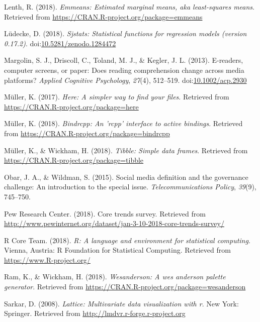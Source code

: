 \documentclass[man, fleqn, noextraspace]{apa6}
\theoremstyle{definition}
\theoremstyle{definition}
\theoremstyle{definition}
\theoremstyle{remark}
\begin{document}
\hypertarget{ref-R-emmeans}{}
Lenth, R. (2018). \emph{Emmeans: Estimated marginal means, aka
least-squares means}. Retrieved from
\url{https://CRAN.R-project.org/package=emmeans}

\hypertarget{ref-R-sjstats}{}
Lüdecke, D. (2018). \emph{Sjstats: Statistical functions for regression
models (version 0.17.2)}.
doi:\href{https://doi.org/10.5281/zenodo.1284472}{10.5281/zenodo.1284472}

\hypertarget{ref-Margolin2013}{}
Margolin, S. J., Driscoll, C., Toland, M. J., \& Kegler, J. L. (2013).
E-readers, computer screens, or paper: Does reading comprehension change
across media platforms? \emph{Applied Cognitive Psychology},
\emph{27}(4), 512--519.
doi:\href{https://doi.org/10.1002/acp.2930}{10.1002/acp.2930}

\hypertarget{ref-R-here}{}
Müller, K. (2017). \emph{Here: A simpler way to find your files}.
Retrieved from \url{https://CRAN.R-project.org/package=here}

\hypertarget{ref-R-bindrcpp}{}
Müller, K. (2018). \emph{Bindrcpp: An 'rcpp' interface to active
bindings}. Retrieved from
\url{https://CRAN.R-project.org/package=bindrcpp}

\hypertarget{ref-R-tibble}{}
Müller, K., \& Wickham, H. (2018). \emph{Tibble: Simple data frames}.
Retrieved from \url{https://CRAN.R-project.org/package=tibble}

\hypertarget{ref-Obar2015}{}
Obar, J. A., \& Wildman, S. (2015). Social media definition and the
governance challenge: An introduction to the special issue.
\emph{Telecommunications Policy}, \emph{39}(9), 745--750.

\hypertarget{ref-Pew}{}
Pew Research Center. (2018). Core trends survey. Retrieved from
\url{http://www.pewinternet.org/dataset/jan-3-10-2018-core-trends-survey/}

\hypertarget{ref-R-base}{}
R Core Team. (2018). \emph{R: A language and environment for statistical
computing}. Vienna, Austria: R Foundation for Statistical Computing.
Retrieved from \url{https://www.R-project.org/}

\hypertarget{ref-R-wesanderson}{}
Ram, K., \& Wickham, H. (2018). \emph{Wesanderson: A wes anderson
palette generator}. Retrieved from
\url{https://CRAN.R-project.org/package=wesanderson}

\hypertarget{ref-R-lattice}{}
Sarkar, D. (2008). \emph{Lattice: Multivariate data visualization with
r}. New York: Springer. Retrieved from
\url{http://lmdvr.r-forge.r-project.org}
\end{document}
